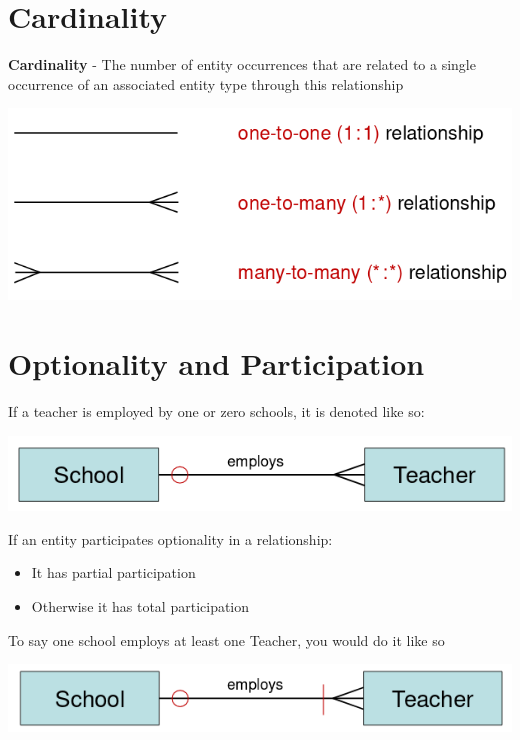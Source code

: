 \documentclass{article}[18pt]
\begin{document}
\section{Cardinality}
\textbf{Cardinality} - The number of entity occurrences that are related to a single occurrence of an associated entity type through this relationship
\begin{center}
	\includegraphics[scale=0.7]{"Crow's Foot"}
\end{center}
\section{Optionality and Participation}
If a teacher is employed by one or zero schools, it is denoted like so:
\begin{center}
	\includegraphics[scale=0.7]{Optionality}
\end{center}
If an entity participates optionality in a relationship:
\begin{itemize}
	\item It has partial participation
	\item Otherwise it has total participation
\end{itemize}
To say one school employs at least one Teacher, you would do it like so
\begin{center}
	\includegraphics[scale=0.7]{Participation}
\end{center}
\end{document}
